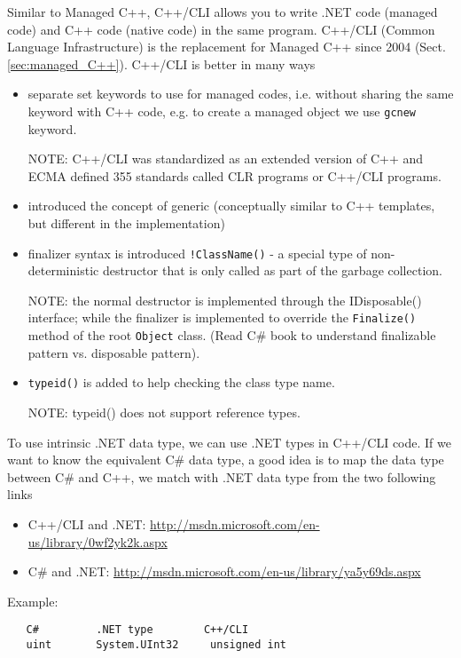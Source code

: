 Similar to Managed C++, C++/CLI allows you to write .NET code (managed code) and
C++ code (native code) in the same program. C++/CLI (Common Language
Infrastructure) is the replacement for Managed C++ since 2004
(Sect.\ref{sec:managed_C++}). C++/CLI is better in many ways
\begin{itemize}
  \item separate set keywords to use for managed codes, i.e. without sharing the same keyword with C++ code, e.g. to create a managed object we use \verb!gcnew! keyword.  
  
NOTE: C++/CLI was standardized as an extended version of C++ and ECMA defined
355 standards called CLR programs or C++/CLI programs.

  \item introduced the concept of generic (conceptually similar to C++ templates, but different in the implementation)
  
  \item finalizer syntax is introduced \verb.!ClassName(). - a special type of
  non-deterministic destructor that is only called as part of the garbage
  collection.
  
NOTE: the normal destructor is implemented through the IDisposable() interface;
while the finalizer is implemented to override the \verb!Finalize()! method of
the root \verb!Object! class. (Read C\# book to understand finalizable pattern
vs. disposable pattern).
  
  \item  \verb!typeid()! is added to help checking the class type name.
  
NOTE: typeid() does not support reference types. 

\end{itemize}


To use intrinsic .NET data type, we can use .NET types in C++/CLI code. If we
want to know the equivalent C\# data type, a good idea is to map the data type
between C\# and C++, we match with .NET data type from the two following links
\begin{itemize}
  \item C++/CLI and .NET:
  \url{http://msdn.microsoft.com/en-us/library/0wf2yk2k.aspx}
  
  \item C\# and .NET:
  \url{http://msdn.microsoft.com/en-us/library/ya5y69ds.aspx}
\end{itemize}

Example:
\begin{verbatim}
   C#         .NET type        C++/CLI
   uint       System.UInt32     unsigned int
\end{verbatim}


